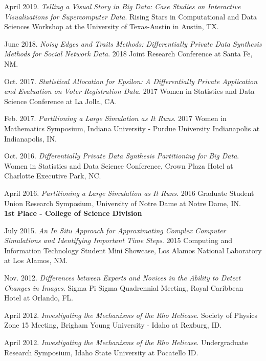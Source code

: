 \documentclass[11pt, letterpaper, roman]{moderncv} %
\begin{document}
\begin{etaremune}[topsep=0pt, itemsep=6pt, partopsep=0pt, parsep=0pt]
  \item April 2019. \textit{Telling a Visual Story in Big Data: Case Studies on Interactive Visualizations for Supercomputer Data}. Rising Stars in Computational and Data Sciences Workshop at the University of Texas-Austin in Austin, TX.
  
  \item June 2018. \textit{Noisy Edges and Traits Methods: Differentially Private Data Synthesis Methods for Social Network Data}. 2018 Joint Research Conference at Santa Fe, NM.
  
  \item Oct. 2017. \textit{Statistical Allocation for Epsilon: A Differentially Private Application and Evaluation on Voter Registration Data}. 2017 Women in Statistics and Data Science Conference at La Jolla, CA.
  
  \item Feb. 2017. \textit{Partitioning a Large Simulation as It Runs}. 2017 Women in Mathematics Symposium, Indiana University - Purdue University Indianapolis at Indianapolis, IN.

  \item Oct. 2016. \textit{Differentially Private Data Synthesis Partitioning for Big Data}. Women in Statistics and Data Science Conference, Crown Plaza Hotel at Charlotte Executive Park, NC. 

  \item April 2016. \textit{Partitioning a Large Simulation as It Runs}. 2016 Graduate Student Union Research Symposium, University of Notre Dame at Notre Dame, IN.\\
  \textbf{1st Place - College of Science Division}

  \item July 2015. \textit{An In Situ Approach for Approximating Complex Computer Simulations and Identifying Important Time Steps}. 2015 Computing and Information Technology Student Mini Showcase, Los Alamos National Laboratory at Los Alamos, NM.

  \item Nov. 2012. \textit{Differences between Experts and Novices in the Ability to Detect Changes in Images}. Sigma Pi Sigma Quadrennial Meeting, Royal Caribbean Hotel at Orlando, FL.

  \item April 2012. \textit{Investigating the Mechanisms of the Rho Helicase}. Society of Physics Zone 15 Meeting, Brigham Young University - Idaho at Rexburg, ID.

  \item April 2012. \textit{Investigating the Mechanisms of the Rho Helicase}. Undergraduate Research Symposium, Idaho State University at Pocatello ID.


\end{etaremune}
\end{document}

